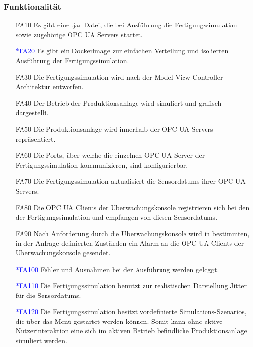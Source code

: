 \documentclass[parskip=full]{scrartcl}
\begin{document}
\subsubsection{Funktionalität}
\begin{enumerate}	
  \item[FA10] Es gibt eine .jar Datei, die bei Ausführung die \gls{Fertigungssimulation} sowie zugehörige \glspl{OPC UA Server} startet.
  \item[\textcolor{blue}{*FA20}] Es gibt ein \gls{Dockerimage} zur einfachen Verteilung und isolierten Ausführung der \gls{Fertigungssimulation}.
  \item[FA30] Die \gls{Fertigungssimulation} wird nach der Model-View-Controller-Architektur entworfen.
  \item[FA40] Der Betrieb der \gls{Produktionsanlage} wird simuliert und grafisch dargestellt.
  \item[FA50] Die \gls{Produktionsanlage} wird innerhalb der \glspl{OPC UA Server} repräsentiert.
  \item[FA60] Die Ports, über welche die einzelnen \gls{OPC UA Server} der \gls{Fertigungssimulation} kommunizieren, sind konfigurierbar.
  \item[FA70] Die \gls{Fertigungssimulation} aktualisiert die \glspl{Sensordatum} ihrer \glspl{OPC UA Server}.
  \item[FA80] Die \glspl{OPC UA Client} der \gls{Uberwachungskonsole} registrieren sich bei den  der \gls{Fertigungssimulation} und empfangen von
    diesen \glspl{Sensordatum}.
  \item[FA90] Nach Anforderung durch die \gls{Uberwachungskonsole} wird in bestimmten, in der Anfrage definierten Zust\"anden ein Alarm an die \glspl{OPC UA Client} der \gls{Uberwachungskonsole} gesendet.
  \item[\textcolor{blue}{*FA100}] Fehler und Ausnahmen bei der Ausführung werden geloggt.
  \item[\textcolor{blue}{*FA110}] Die \gls{Fertigungssimulation} benutzt zur realistischen Darstellung \gls{Jitter} für die \glspl{Sensordatum}.
  \item[\textcolor{blue}{*FA120}] Die \gls{Fertigungssimulation} besitzt vordefinierte \glspl{Simulations-Szenario}, die über das Menü gestartet werden können. Somit kann ohne aktive Nutzerinteraktion eine sich
    im aktiven Betrieb befindliche \gls{Produktionsanlage} simuliert werden.
\end{enumerate}
\end{document}
